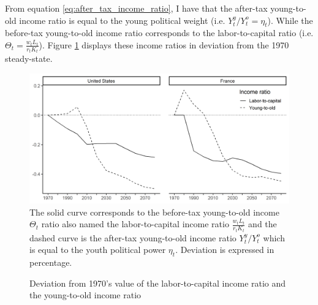 From equation \eqref{eq:after_tax_income_ratio}, I have that the after-tax young-to-old income ratio is equal to the young political weight (i.e. $Y_t^y/Y_t^o = \eta_t$). While the before-tax young-to-old income ratio corresponds to the labor-to-capital ratio (i.e. $\Theta_t = \frac{w_tL_t}{r_tK_t}$). Figure \ref{fig:raw_vs_net_inc_ratio} displays these income ratios in deviation from the 1970 steady-state.
\begin{figure}[tb]
	\centering
		\caption{Deviation from 1970's value of the labor-to-capital income ratio and the young-to-old income ratio} \label{fig:raw_vs_net_inc_ratio}
	\includegraphics[width=1\linewidth]{../result/redistribution/dev_incratio_raw_vs_net.png}
	\vspace{-6ex}
	\justify\singlespacing\footnotesize The solid curve corresponds to the before-tax young-to-old income $\Theta_t$ ratio also named the labor-to-capital income ratio $\frac{w_tL_t}{r_tK_t}$ and the dashed curve is the after-tax young-to-old income ratio $Y_t^y/Y_t^o$ which is equal to the youth political power $\eta_t$. Deviation is expressed in percentage.
\end{figure}
